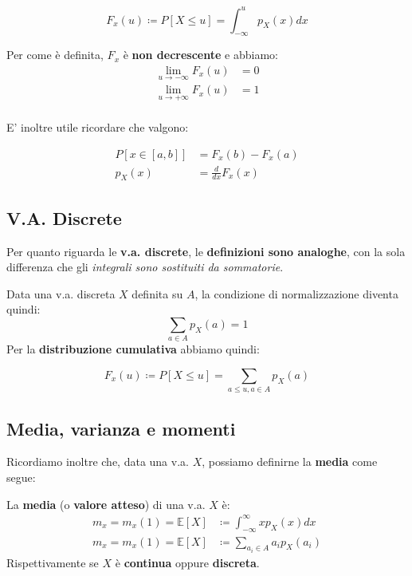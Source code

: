 \begin{definition}
    \[
        F_x (u) \coloneqq  P[X \le u] = \int_{-\infty}^u p_X(x) dx
    \] 
\end{definition}

Per come è definita, $F_x$ è \textbf{non decrescente} e abbiamo:
\[
    \begin{aligned}
        \lim_{u \to -\infty} F_x(u) &= 0 \\ 
        \lim_{u \to +\infty} F_x(u) &= 1 \\ 
    \end{aligned}
\]

E' inoltre utile ricordare che valgono:

\begin{prop}
    \[
        \begin{aligned}
            P[x \in [a,b]] &= F_x(b) - F_x(a) \\ 
            p_X(x) &= \frac{d}{dx} F_x (x)
        \end{aligned}
    \] 
\end{prop}

\subsection{V.A. Discrete}

Per quanto riguarda le \textbf{v.a. discrete}, le 
\textbf{definizioni sono analoghe}, con la sola differenza
che gli \textit{integrali sono sostituiti da sommatorie}.

Data una v.a. discreta $X$ definita su $A$, la condizione 
di normalizzazione diventa quindi:
\[
    \sum_{a\in A} p_X(a) = 1
\]
Per la \textbf{distribuzione cumulativa} abbiamo quindi:

\begin{definition}
    \[
        F_x(u) \coloneqq P[X\le u] = \sum_{a\le u, a\in A} p_X(a)
    \] 
\end{definition}

\subsection{Media, varianza e momenti}

Ricordiamo inoltre che, data una v.a. $X$, possiamo definirne
la \textbf{media} come segue:

\begin{definition}[MEDIA]
    La \textbf{media} (o \textbf{valore atteso}) di una v.a. $X$ è:
    \[
        \begin{aligned}
            m_x = m_x(1) = \mathbb{E}[X] &\coloneqq \int_{-\infty}^{\infty} x p_X (x) dx \\ 
            m_x = m_x(1) = \mathbb{E}[X] &\coloneqq \sum_{a_i \in A} a_i p_X(a_i)
        \end{aligned}
    \] 
    Rispettivamente se $X$ è \textbf{continua} oppure \textbf{discreta}.
\end{definition}

